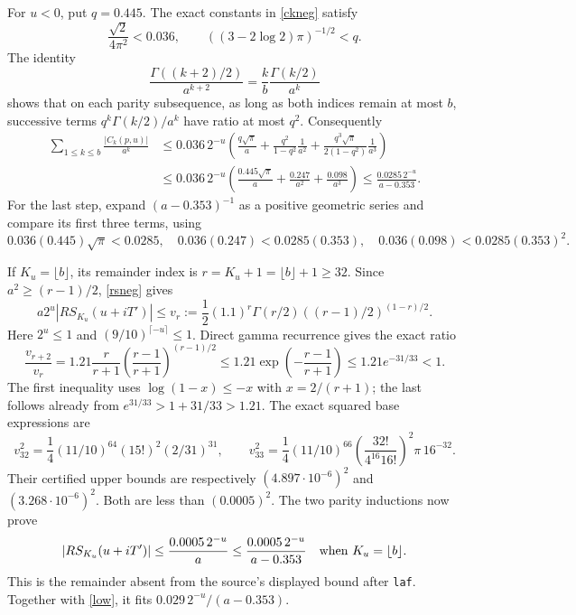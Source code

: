 \documentclass[11pt]{article}
\begin{document}
For $u<0$, put $q=0.445$. The exact constants in \eqref{ckneg}
satisfy
\[
 \frac{\sqrt2}{4\pi^2}<0.036,\qquad
 ((3-2\log2)\pi)^{-1/2}<q.
\]
The identity
\[
 \frac{\Gamma((k+2)/2)}{a^{k+2}}
 =\frac{k}{b}\frac{\Gamma(k/2)}{a^k}
\]
shows that on each parity subsequence, as long as both indices remain
at most $b$, successive terms $q^k\Gamma(k/2)/a^k$ have ratio at
most $q^2$. Consequently
\begin{align*}
 \sum_{1\le k\le b}\frac{|C_k(p,u)|}{a^k}
 &\le0.036\,2^{-u}\left(
 \frac{q\sqrt\pi}{a}+
 \frac{q^2}{1-q^2}\frac1{a^2}+
 \frac{q^3\sqrt\pi}{2(1-q^2)}\frac1{a^3}\right)\\
 &\le0.036\,2^{-u}\left(
 \frac{0.445\sqrt\pi}{a}+\frac{0.247}{a^2}+\frac{0.098}{a^3}\right)
 \le\frac{0.0285\,2^{-u}}{a-0.353}.\tag{L}\label{low}
\end{align*}
For the last step, expand $(a-0.353)^{-1}$ as a positive geometric
series and compare its first three terms, using
\[
 0.036(0.445)\sqrt\pi<0.0285,\quad
 0.036(0.247)<0.0285(0.353),\quad
 0.036(0.098)<0.0285(0.353)^2.
\]

If $K_u=\lfloor b\rfloor$, its remainder index is
$r=K_u+1=\lfloor b\rfloor+1\ge32$. Since
$a^2\ge(r-1)/2$, \eqref{rsneg} gives
\begin{equation}\label{vr}
 a2^u|RS_{K_u}(u+iT')|
 \le v_r:=\frac12(1.1)^r\Gamma(r/2)
                           ((r-1)/2)^{(1-r)/2}.
\end{equation}
Here $2^u\le1$ and $(9/10)^{\lceil-u\rceil}\le1$.
Direct gamma recurrence gives the exact ratio
\[
 \frac{v_{r+2}}{v_r}=1.21\frac r{r+1}
     \left(\frac{r-1}{r+1}\right)^{(r-1)/2}
 \le1.21\exp\!\left(-\frac{r-1}{r+1}\right)
 \le1.21e^{-31/33}<1.
\]
The first inequality uses $\log(1-x)\le-x$ with $x=2/(r+1)$;
the last follows already from $e^{31/33}>1+31/33>1.21$.
The exact squared base expressions are
\[
 v_{32}^2=\frac14(11/10)^{64}(15!)^2(2/31)^{31},\qquad
 v_{33}^2=\frac14(11/10)^{66}
 \left(\frac{32!}{4^{16}16!}\right)^2\pi\,16^{-32}.
\]
Their certified upper bounds are respectively
$(4.897\cdot10^{-6})^2$ and $(3.268\cdot10^{-6})^2$.
Both are less than $(0.0005)^2$. The two parity inductions now prove
\[
 |RS_{K_u}(u+iT')|\le\frac{0.0005\,2^{-u}}a
 \le\frac{0.0005\,2^{-u}}{a-0.353}
 \quad\hbox{when }K_u=\lfloor b\rfloor.
\]
This is the remainder absent from the source's displayed bound
after \texttt{laf}. Together with \eqref{low}, it fits
$0.029\,2^{-u}/(a-0.353)$.
\end{document}
